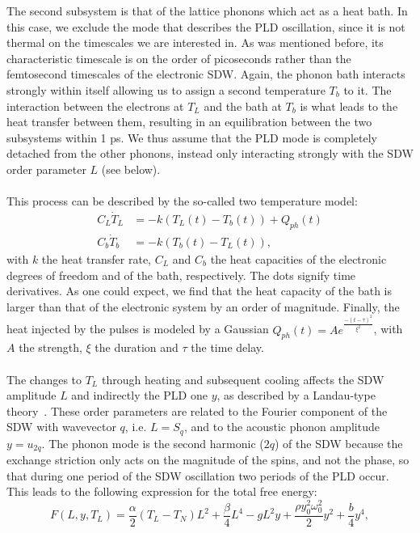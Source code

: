 The second subsystem is that of the lattice phonons which act as a heat bath.
In this case, we exclude the mode that describes the PLD oscillation, since it is not thermal on the timescales we are interested in. As was mentioned before, its characteristic timescale is on the order of picoseconds rather than the femtosecond timescales of the electronic SDW.
Again, the phonon bath interacts strongly within itself allowing us to assign a second temperature $T_b$ to it.
The interaction between the electrons at $T_L$ and the bath at $T_b$ is what leads to the heat transfer between them, resulting in an equilibration between the two subsystems within 1 ps.
We thus assume that the PLD mode is completely detached from the other phonons, instead only interacting strongly with the SDW order parameter $L$ (see below). 
\\\\
This process can be described by the so-called two temperature model:
\begin{align}
	\label{eq:Cr_twotemp}
	C_L \dot{T}_L &= -k(T_L(t) - T_b(t)) + Q_{ph}(t) \\
	C_b \dot{T}_b &= -k(T_b(t) - T_L(t)),\nonumber
\end{align}
with $k$ the heat transfer rate, $C_L$ and $C_b$ the heat capacities of the electronic degrees of freedom and of the bath, respectively.
The dots signify time derivatives.
As one could expect, we find that the heat capacity of the bath is larger than that of the electronic system by an order of magnitude.
Finally, the heat injected by the pulses is modeled by a Gaussian $Q_{ph}(t) = A e^{\frac{-(t - \tau)^2}{\xi^2}}$, with $A$ the strength, $\xi$ the duration and $\tau$ the time delay.
\\\\
The changes to $T_L$ through heating and subsequent cooling affects the SDW amplitude $L$ and indirectly the PLD one $y$, as described by a Landau-type theory~\cite{Khomskii2010}.
These order parameters are related to the Fourier component of the SDW with wavevector $q$, i.e. $L = S_q$, and to the acoustic phonon amplitude $y = u_{2q}$.
The phonon mode is the second harmonic ($2q$) of the SDW because the exchange striction only acts on the magnitude of the spins, and not the phase, so that during one period of the SDW oscillation two periods of the PLD occur.
This leads to the following expression for the total free energy:
\begin{equation}
	\label{eq:Cr_landau}
	F(L, y, T_L) = \frac{\alpha}{2}(T_L - T_N) L^2 + \frac{\beta}{4} L^4 - g L^2 y + \frac{\rho y_0^2 \omega_0^2}{2} y^2 + \frac{b}{4} y^4,
\end{equation}
